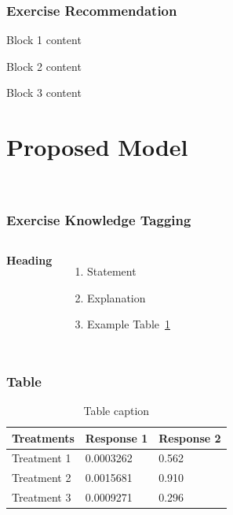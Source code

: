 \documentclass{beamer}
\begin{document}
\begin{frame}
  \frametitle{Exercise Recommendation}
  \begin{block}{Block 1}
    content
  \end{block}

  \begin{block}{Block 2}
    content
  \end{block}

  \begin{block}{Block 3}
    content
  \end{block}
\end{frame}

\section{Proposed Model}
\begin{frame}
  \
\end{frame}




\begin{frame}
  \frametitle{Exercise Knowledge Tagging}
  \begin{columns}[c] %

    \textbf{Heading}
    \begin{enumerate}
      \item Statement
      \item Explanation
      \item Example Table~\ref{tbl:t1}
    \end{enumerate}



  \end{columns}
\end{frame}

\begin{frame}
  \frametitle{Table}
  \begin{table}
    \caption{Table caption}\label{tbl:t1}
    \begin{tabular}{l l l}
      \toprule
      \textbf{Treatments} & \textbf{Response 1} & \textbf{Response 2} \\
      \midrule
      Treatment 1         & 0.0003262           & 0.562               \\
      Treatment 2         & 0.0015681           & 0.910               \\
      Treatment 3         & 0.0009271           & 0.296               \\
      \bottomrule
    \end{tabular}
  \end{table}
\end{frame}
\end{document}
